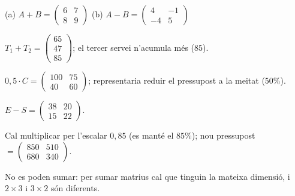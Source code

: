 \begin{solucions}
\begin{sollist}
  \item (a) $A+B=\begin{pmatrix} 6 & 7 \\ 8 & 9 \end{pmatrix}$ \quad
        (b) $A-B=\begin{pmatrix} 4 & -1 \\ -4 & 5 \end{pmatrix}$
  \item $T_1+T_2=\begin{pmatrix} 65 \\ 47 \\ 85 \end{pmatrix}$;
        \;el tercer servei n'acumula més ($85$).
  \item $0{,}5\cdot C=\begin{pmatrix} 100 & 75 \\ 40 & 60 \end{pmatrix}$;
        \;representaria reduir el pressupost a la meitat ($50\%$).
  \item $E-S=\begin{pmatrix} 38 & 20 \\ 15 & 22 \end{pmatrix}$.
  \item Cal multiplicar per l'escalar $0{,}85$ (es manté el $85\%$);
        \;nou pressupost $=\begin{pmatrix} 850 & 510 \\ 680 & 340 \end{pmatrix}$.
  \item No es poden sumar: per sumar matrius cal que tinguin la mateixa
        dimensió, i $2\times 3$ i $3\times 2$ són diferents.
\end{sollist}
\end{solucions}
